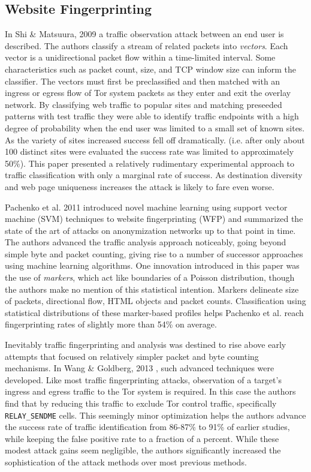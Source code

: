 \documentclass[sigconf]{acmart}
\begin{document}
\subsection{Website Fingerprinting}\label{subsec:website_fingerprinting}

In Shi \& Matsuura, 2009 \cite{shi_fingerprinting_2009} a traffic
observation attack between an end user is described.  The authors
classify a stream of related packets into \emph{vectors}.  Each vector
is a unidirectional packet flow within a time-limited interval.  Some
characteristics such as packet count, size, and TCP window size can
inform the classifier.  The vectors must first be preclassified and then
matched with an ingress or egress flow of Tor system packets as they
enter and exit the overlay network.  By classifying web traffic to
popular sites and matching preseeded patterns with test traffic they
were able to identify traffic endpoints with a high degree of
probability when the end user was limited to a small set of known sites.
As the variety of sites increased success fell off dramatically. (i.e.
after only about 100 distinct sites were evaluated the success rate was
limited to approximately 50\%).  This paper presented a relatively
rudimentary experimental approach to traffic classification with only a
marginal rate of success.  As destination diversity and web page
uniqueness increases the attack is likely to fare even worse.

Pachenko et al. 2011 \cite{panchenko_website_2011} introduced novel
machine learning using support vector machine (SVM) techniques to
website fingerprinting (WFP) and summarized the state of the art of
attacks on anonymization networks up to that point in time.  The authors
advanced the traffic analysis approach noticeably, going beyond simple
byte and packet counting, giving rise to a number of successor
approaches using machine learning algorithms.  One innovation introduced
in this paper was the use of \emph{markers}, which act like boundaries
of a Poisson distribution, though the authors make no mention of this
statistical intention.  Markers delineate size of packets, directional
flow, HTML objects and packet counts.  Classification using statistical
distributions of these marker-based profiles helps Pachenko et al.
reach fingerprinting rates of slightly more than 54\% on average.

Inevitably traffic fingerprinting and analysis was destined to rise
above early attempts that focused on relatively simpler packet and byte
counting mechanisms.  In Wang \& Goldberg, 2013
\cite{wang_improved_2013}, such advanced techniques were developed.
Like most traffic fingerprinting attacks, observation of a target's
ingress and egress traffic to the Tor system is required.  In this case
the authors find that by reducing this traffic to exclude Tor control
traffic, specifically \texttt{RELAY\_SENDME} cells.  This seemingly
minor optimization helps the authors advance the success rate of traffic
identification from 86-87\% to 91\% of earlier studies, while keeping
the false positive rate to a fraction of a percent.  While these modest
attack gains seem negligible, the authors significantly increased the
sophistication of the attack methods over most previous methods.
\end{document}
